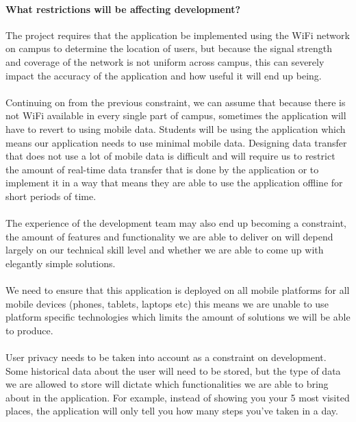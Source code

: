 \documentclass[a4paper,12pt]{article}
\begin{document}
		\paragraph*{What restrictions will be affecting development?} 
		The project requires that the application be implemented using the WiFi network on campus to determine the location of users, but because the signal strength and coverage of the network is not uniform across campus, this can severely impact the accuracy of the application and how useful it will end up being.
		\\
		\\
		Continuing on from the previous constraint, we can assume that because there is not WiFi available in every single part of campus, sometimes the application will have to revert to using mobile data. Students will be using the application which means our application needs to use minimal mobile data. Designing data transfer that does not use a lot of mobile data is difficult and will require us to restrict the amount of real-time data transfer that is done by the application or to implement it in a way that means they are able to use the application offline for short periods of time.  
		\\
		\\
		The experience of the development team may also end up becoming a constraint, the amount of features and functionality we are able to deliver on will depend largely on our technical skill level and whether we are able to come up with elegantly simple solutions.
		\\
		\\
		We need to ensure that this application is deployed on all mobile platforms for all mobile devices (phones, tablets, laptops etc) this means we are unable to use platform specific technologies which limits the amount of solutions we will be able to produce. 
		\\
		\\
		User privacy needs to be taken into account as a constraint on development. Some historical data about the user will need to be stored, but the type of data we are allowed to store will dictate which functionalities we are able to bring about in the application. For example, instead of showing you your 5 most visited places, the application will only tell you how many steps you've taken in a day. 
		\\
		\\
		
		
\end{document}
